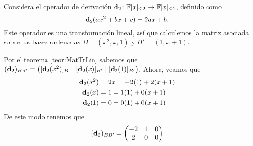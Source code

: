 \begin{example}
  Considera el operador de derivación $\mathbf{d}_2 \colon \mathbb{F}[x]_{\leq 2} \to \mathbb{F}[x]_{\leq 1}$, definido como
    \[
      \mathbf{d}_2 (ax^2 + bx + c) = 2ax + b.
    \]
  Este operador es una transformación lineal, así que calculemos la matriz asociada sobre las bases ordenadas $B = (x^2, x, 1)$ y $B' = (1, x+1)$.

  \examplesolution
  Por el teorema \ref{teor:MatTrLin} sabemos que $(\mathbf{d}_2)_{BB'} = \bigl( [\mathbf{d}_2(x^2)]_{B'} \mid [\mathbf{d}_2(x)]_{B'} \mid [\mathbf{d}_2(1)]_{B'} \bigr)$. Ahora, veamos que
  \begin{align}
    \mathbf{d}_2(x^2) &= 2x = -2(1) + 2(x+1) \\
    \mathbf{d}_2(x)   &= 1  = 1(1) + 0(x+1) \\
    \mathbf{d}_2(1)   &= 0  = 0(1) + 0(x+1) \\
  \end{align}
  De este modo tenemos que 
    \[ (\mathbf{d}_2)_{BB'} = \begin{pmatrix}
      -2 & 1 & 0 \\
      2 & 0 & 0
    \end{pmatrix} \]
\end{example}

